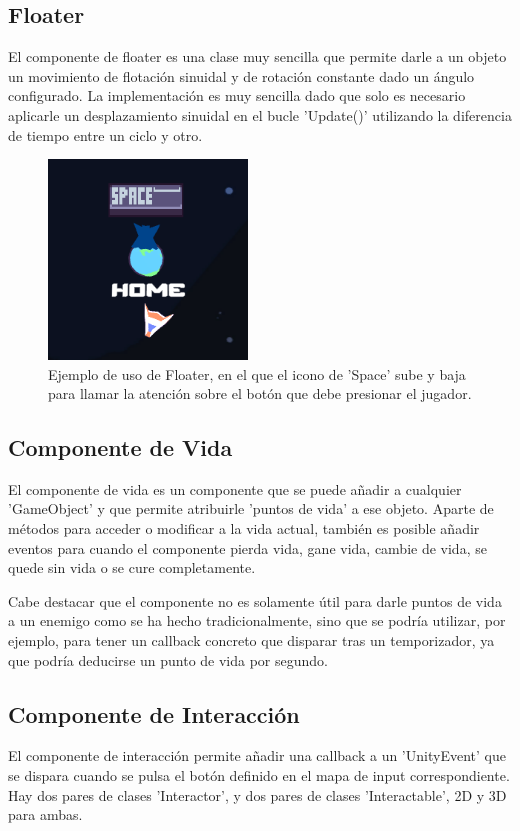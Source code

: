 \subsection{Floater}
El componente de floater es una clase muy sencilla que permite darle a un objeto un movimiento de flotación sinuidal y de rotación constante dado un ángulo configurado. La 
implementación es muy sencilla dado que solo es necesario aplicarle un desplazamiento sinuidal en el bucle 'Update()' utilizando la diferencia de tiempo entre un ciclo y otro.

\begin{figure}[H]
  \centering
    \includegraphics[width=200px,clip=true]{floaterExample.png}
  \caption{Ejemplo de uso de Floater, en el que el icono de 'Space' sube y baja para llamar la atención sobre el botón que debe presionar el jugador.}
  \label{fig:floaterExample}
\end{figure}


\subsection{Componente de Vida}
El componente de vida es un componente que se puede añadir a cualquier 'GameObject' y que permite atribuirle 'puntos de vida' a ese objeto. Aparte de métodos para acceder 
o modificar a la vida actual, también es posible añadir eventos para cuando el componente pierda vida, gane vida, cambie de vida, se quede sin vida o se cure completamente. 

Cabe destacar que el componente no es solamente útil para darle puntos de vida a un enemigo como se ha hecho tradicionalmente, sino que se podría utilizar, por ejemplo, 
para tener un callback concreto que disparar tras un temporizador, ya que podría deducirse un punto de vida por segundo.


\subsection{Componente de Interacción}
El componente de interacción permite añadir una callback a un 'UnityEvent' que se dispara cuando se pulsa el botón definido en el mapa de input correspondiente. 
Hay dos pares de clases 'Interactor', y dos pares de clases 'Interactable', 2D y 3D para ambas. 

